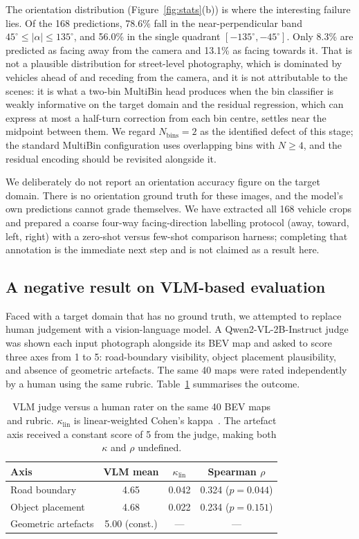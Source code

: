 \documentclass[sigconf]{acmart}
\newcommand{\rev}[1]{{\color{revcolor}#1}}
\begin{document}
The orientation distribution (Figure~\ref{fig:stats}(b)) is where the interesting failure lies. Of the 168 predictions, 78.6\% fall in the near-perpendicular band $45^\circ \leq |\alpha| \leq 135^\circ$, and 56.0\% in the single quadrant $[-135^\circ, -45^\circ]$. Only 8.3\% are predicted as facing away from the camera and 13.1\% as facing towards it. That is not a plausible distribution for street-level photography, which is dominated by vehicles ahead of and receding from the camera, and it is not attributable to the scenes: it is what a two-bin MultiBin head produces when the bin classifier is weakly informative \rev{on the target domain} and the residual regression, which can express at most a half-turn correction from each bin centre, settles near the midpoint between them. We regard $N_{\text{bins}} = 2$ as the identified defect of this stage; the standard MultiBin configuration uses overlapping bins with $N \geq 4$, and the residual encoding should be revisited alongside it.

We deliberately do not report an orientation accuracy figure on the target domain. There is no orientation ground truth for these images, and the model's own predictions cannot grade themselves. We have extracted all 168 vehicle crops and prepared a coarse four-way facing-direction labelling protocol (away, toward, left, right) with a zero-shot versus few-shot comparison harness; completing that annotation is the immediate next step and is not claimed as a result here.

\subsection{A negative result on VLM-based evaluation}\label{sec:vlm}

Faced with a target domain that has no ground truth, we attempted to replace human judgement with a vision-language model. A Qwen2-VL-2B-Instruct judge~\cite{wang2024qwen2vl} was shown each input photograph alongside its BEV map and asked to score three axes from 1 to 5: road-boundary visibility, object placement plausibility, and absence of geometric artefacts. The same 40 maps were rated independently by a human using the same rubric. Table~\ref{tab:vlm} summarises the outcome.

\begin{table}[t]
\caption{VLM judge versus a human rater on the same 40 BEV maps and rubric. $\kappa_{\text{lin}}$ is linear-weighted Cohen's kappa~\cite{cohen1968kappa}. The artefact axis received a constant score of 5 from the judge, making both $\kappa$ and $\rho$ undefined.}
\label{tab:vlm}
\begin{tabular}{lccc}
\toprule
Axis & VLM mean & $\kappa_{\text{lin}}$ & Spearman $\rho$ \\
\midrule
Road boundary & 4.65 & 0.042 & 0.324 ($p{=}0.044$) \\
Object placement & 4.68 & 0.022 & 0.234 ($p{=}0.151$) \\
Geometric artefacts & 5.00 (const.) & --- & --- \\
\bottomrule
\end{tabular}
\end{table}
\end{document}
